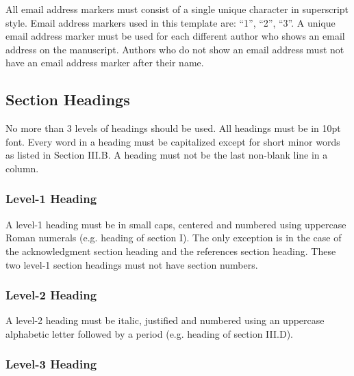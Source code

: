 \documentclass[conference,10pt,letterpaper]{IEEEtran}%
\begin{document}
All email address markers must consist of a single unique character in
superscript style. Email address markers used in this template are:
``1'', ``2'', ``3''. A unique email address marker must be used for each
different author who shows an email address on the manuscript. Authors
who do not show an email address must not have an email address marker
after their name.


\subsection{Section Headings}
\label{sec:headings}

No more than 3 levels of headings should be used. All headings must be
in 10pt font. Every word in a heading must be capitalized except for
short minor words as listed in Section III.B. A heading must not be
the last non-blank line in a column.


\subsubsection{Level-1 Heading}

A level-1 heading must be in small caps, centered and numbered using
uppercase Roman numerals (e.g. heading of section I).  The only
exception is in the case of the acknowledgment section heading and the
references section heading. These two level-1 section headings must
not have section numbers.


\subsubsection{Level-2 Heading}

A level-2 heading must be italic, justified and numbered using an
uppercase alphabetic letter followed by a period (e.g. heading of
section III.D).


\subsubsection{Level-3 Heading}
\label{sec:level3heading}
\end{document}
